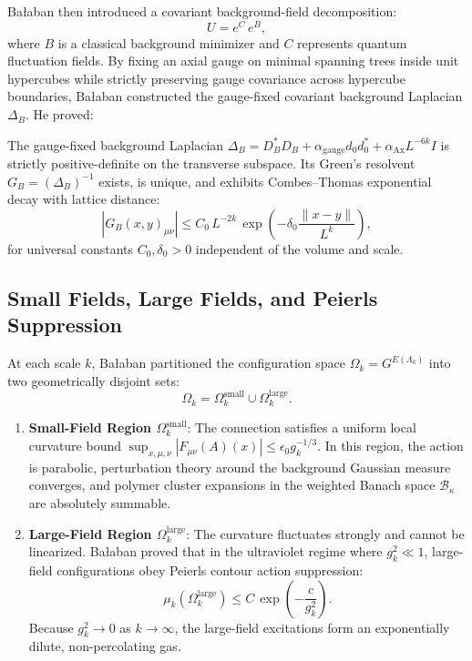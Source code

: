 Ba\l aban then introduced a covariant background-field decomposition:
\begin{equation}
U = e^C \, e^B,
\end{equation}
where $B$ is a classical background minimizer and $C$ represents quantum fluctuation fields. By fixing an axial gauge on minimal spanning trees inside unit hypercubes while strictly preserving gauge covariance across hypercube boundaries, Ba\l aban constructed the gauge-fixed covariant background Laplacian $\Delta_B$. He proved:
\begin{theorem}
\label{thm:balaban_combes_thomas_intro}
The gauge-fixed background Laplacian $\Delta_B = D_B^* D_B + \alpha_{\mathrm{gauge}} d_0 d_0^* + \alpha_{\mathrm{Ax}} L^{-6k} I$ is strictly positive-definite on the transverse subspace. Its Green's resolvent $G_B = (\Delta_B)^{-1}$ exists, is unique, and exhibits Combes--Thomas exponential decay with lattice distance:
\begin{equation}
\left| G_B(x, y)_{\mu\nu} \right| \le C_0 \, L^{-2k} \, \exp\left( -\delta_0 \frac{\|x - y\|}{L^k} \right),
\end{equation}
for universal constants $C_0, \delta_0 > 0$ independent of the volume and scale.
\end{theorem}

\subsection{Small Fields, Large Fields, and Peierls Suppression}
\label{subsec:small_large_fields_intro}
At each scale $k$, Ba\l aban partitioned the configuration space $\Omega_k = G^{E(\Lambda_k)}$ into two geometrically disjoint sets:
\begin{equation}
\Omega_k = \Omega_k^{\mathrm{small}} \cup \Omega_k^{\mathrm{large}}.
\end{equation}
\begin{enumerate}
    \item \textbf{Small-Field Region $\Omega_k^{\mathrm{small}}$}: The connection satisfies a uniform local curvature bound $\sup_{x, \mu, \nu} |F_{\mu\nu}(A)(x)| \le \epsilon_0 g_k^{-1/3}$. In this region, the action is parabolic, perturbation theory around the background Gaussian measure converges, and polymer cluster expansions in the weighted Banach space $\mathcal{B}_\kappa$ are absolutely summable.
    \item \textbf{Large-Field Region $\Omega_k^{\mathrm{large}}$}: The curvature fluctuates strongly and cannot be linearized. Ba\l aban proved that in the ultraviolet regime where $g_k^2 \ll 1$, large-field configurations obey Peierls contour action suppression:
    \begin{equation}
    \label{eq:peierls_suppression_intro}
    \mu_k\left( \Omega_k^{\mathrm{large}} \right) \le C \, \exp\left( -\frac{c}{g_k^2} \right).
    \end{equation}
    Because $g_k^2 \to 0$ as $k \to \infty$, the large-field excitations form an exponentially dilute, non-percolating gas.
\end{enumerate}


